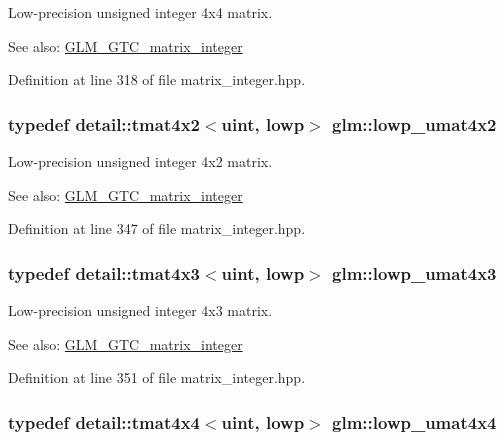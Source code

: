 Low-precision unsigned integer 4x4 matrix. \begin{Desc}
\item[See also:]\hyperlink{group__gtc__matrix__integer}{GLM\_\-GTC\_\-matrix\_\-integer} \end{Desc}


Definition at line 318 of file matrix\_\-integer.hpp.\hypertarget{group__gtc__matrix__integer_g7583563f93096623d54ec8fddd806d13}{
\subsubsection[lowp\_\-umat4x2]{\setlength{\rightskip}{0pt plus 5cm}typedef detail::tmat4x2$<$uint, lowp$>$ {\bf glm::lowp\_\-umat4x2}}}
\label{group__gtc__matrix__integer_g7583563f93096623d54ec8fddd806d13}


Low-precision unsigned integer 4x2 matrix. \begin{Desc}
\item[See also:]\hyperlink{group__gtc__matrix__integer}{GLM\_\-GTC\_\-matrix\_\-integer} \end{Desc}


Definition at line 347 of file matrix\_\-integer.hpp.\hypertarget{group__gtc__matrix__integer_g03af6e7ea92be81959305fc89a239cf5}{
\subsubsection[lowp\_\-umat4x3]{\setlength{\rightskip}{0pt plus 5cm}typedef detail::tmat4x3$<$uint, lowp$>$ {\bf glm::lowp\_\-umat4x3}}}
\label{group__gtc__matrix__integer_g03af6e7ea92be81959305fc89a239cf5}


Low-precision unsigned integer 4x3 matrix. \begin{Desc}
\item[See also:]\hyperlink{group__gtc__matrix__integer}{GLM\_\-GTC\_\-matrix\_\-integer} \end{Desc}


Definition at line 351 of file matrix\_\-integer.hpp.\hypertarget{group__gtc__matrix__integer_g394ee910348beffe9c7d6b694d5efe5f}{
\subsubsection[lowp\_\-umat4x4]{\setlength{\rightskip}{0pt plus 5cm}typedef detail::tmat4x4$<$uint, lowp$>$ {\bf glm::lowp\_\-umat4x4}}}
\label{group__gtc__matrix__integer_g394ee910348beffe9c7d6b694d5efe5f}


